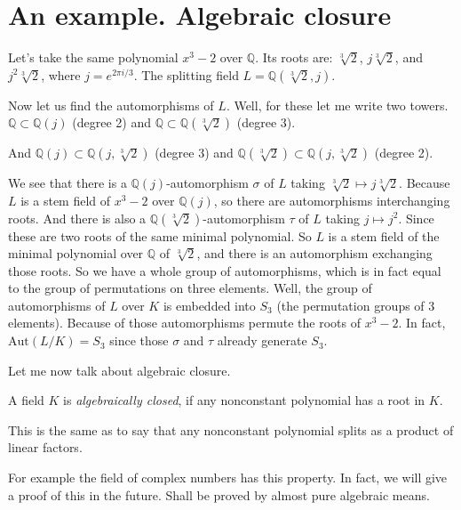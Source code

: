 \section{An example. Algebraic closure}
\begin{example}
Let's take the same polynomial $x^3 - 2$ over $\mathbb{Q}$. Its roots are: $\sqrt[3]{2}$, $j\sqrt[3]{2}$, and $j^2\sqrt[3]{2}$, where $j=e^{2 \pi i/3}$. The splitting field $L=\mathbb{Q}(\sqrt[3]{2},j)$. 

Now let us find the automorphisms of $L$. Well, for these let me write two towers. $\mathbb{Q}\subset \mathbb{Q}(j)$ (degree 2) and $\mathbb{Q}\subset \mathbb{Q}(\sqrt[3]{2})$ (degree 3). 

And $\mathbb{Q}(j)\subset \mathbb{Q}(j,\sqrt[3]{2})$ (degree 3) and $\mathbb{Q}(\sqrt[3]{2})\subset \mathbb{Q}(j,\sqrt[3]{2})$ (degree 2).

We see that there is a $\mathbb{Q}(j)$-automorphism $\sigma$ of $L$ taking $\sqrt[3]{2}\mapsto j\sqrt[3]{2}$. Because $L$ is a stem field of $x^3 - 2$ over $\mathbb{Q}(j)$, so there are automorphisms interchanging roots. And there is also a $\mathbb{Q}(\sqrt[3]{2})$-automorphism $\tau$ of $L$ taking $j\mapsto j^2$. Since these are two roots of the same minimal polynomial. So $L$ is a stem field of the minimal polynomial over $\mathbb{Q}$ of $\sqrt[3]{2}$, and there is an automorphism exchanging those roots. So we have a whole group of automorphisms, which is in fact equal to the group of permutations on three elements. Well, the group of automorphisms of $L$ over $K$ is embedded into $S_3$ (the permutation groups of 3 elements). Because of those automorphisms permute the roots of $x^3 - 2$. In fact, $\text{Aut}(L/K)=S_3$ since those $\sigma$ and $\tau$ already generate $S_3$. 
\end{example}

Let me now talk about algebraic closure. 

\begin{definition}
A field $K$ is \textit{algebraically closed}, if any nonconstant polynomial has a root in $K$.
\end{definition}

This is the same as to say that any nonconstant polynomial splits as a product of linear factors. 

\begin{example}
For example the field of complex numbers has this property. In fact, we will give a proof of this in the future. Shall be proved by almost pure algebraic means.
\end{example}

